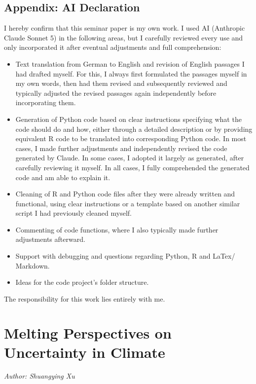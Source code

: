 \documentclass[
]{krantz}
\providecommand{\tightlist}{%
  \setlength{\itemsep}{0pt}\setlength{\parskip}{0pt}}
\begin{document}
\section{Appendix: AI Declaration}\label{appendix-ai-declaration-1}

I hereby confirm that this seminar paper is my own work. I used AI (Anthropic Claude Sonnet 5) in the following areas, but I carefully reviewed every use and only incorporated it after eventual adjustments and full comprehension:

\begin{itemize}
\tightlist
\item
  Text translation from German to English and revision of English passages I had drafted myself. For this, I always first formulated the passages myself in my own words, then had them revised and subsequently reviewed and typically adjusted the revised passages again independently before incorporating them.
\item
  Generation of Python code based on clear instructions specifying what the code should do and how, either through a detailed description or by providing equivalent R code to be translated into corresponding Python code. In most cases, I made further adjustments and independently revised the code generated by Claude. In some cases, I adopted it largely as generated, after carefully reviewing it myself. In all cases, I fully comprehended the generated code and am able to explain it.
\item
  Cleaning of R and Python code files after they were already written and functional, using clear instructions or a template based on another similar script I had previously cleaned myself.
\item
  Commenting of code functions, where I also typically made further adjustments afterward.
\item
  Support with debugging and questions regarding Python, R and LaTex/ Markdown.
\item
  Ideas for the code project's folder structure.
\end{itemize}

The responsibility for this work lies entirely with me.

\chapter{Melting Perspectives on Uncertainty in Climate}\label{unc}

\emph{Author: Shuangying Xu}
\end{document}
